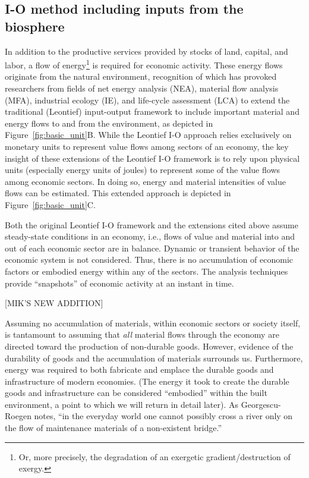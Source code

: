 \subsection{I-O method including inputs from the biosphere}
\label{sec:IO_resource}

In addition to the productive services provided by stocks of land, capital, and labor,
a flow of energy\footnote{Or, more precisely, 
the degradation of an exergetic gradient/destruction of exergy.} 
is required for economic activity. 
These energy flows originate from the natural environment, 
recognition of which has provoked researchers from fields of 
net energy analysis (NEA), 
material flow analysis (MFA), 
industrial ecology (IE), and 
life-cycle assessment (LCA) 
to extend the traditional (Leontief) input-output framework 
to include important material and energy flows to and from the environment, 
as depicted in Figure~\ref{fig:basic_unit}B.\cite{Carter1974,Bullard1975,Bullard1976a,Herendeen1978,Costanza:1980ww,Casler1984,Joshi:1999uw,Suh2009}
While the Leontief I-O approach relies exclusively 
on monetary units to represent value flows 
among sectors of an economy, 
the key insight of these extensions 
of the Leontief I-O framework is to rely upon physical units 
(especially energy units of joules) 
to represent some of the value flows among economic sectors. 
In doing so, energy and material intensities of value flows can be estimated. 
This extended approach is depicted in Figure~\ref{fig:basic_unit}C. 

Both the original Leontief I-O framework 
and the extensions cited above 
assume steady-state conditions in an economy, 
i.e., flows of value and material into 
and out of each economic sector are in balance. 
Dynamic or transient behavior 
of the economic system is not considered. 
Thus, there is no accumulation of economic factors 
or embodied energy within any of the sectors. 
The analysis techniques provide ``snapshots'' 
of economic activity at an instant in time.

[MIK'S NEW ADDITION]

Assuming no accumulation of materials, 
within economic sectors or society itself, 
is tantamount to assuming that \emph{all} material flows 
through the economy are directed toward the production of non-durable goods. 
However, evidence of the durability of goods 
and the accumulation of materials surrounds us. 
Furthermore, energy was required to both fabricate and emplace 
the durable goods and infrastructure of modern economies. 
(The energy it took to create the durable goods and infrastructure 
can be considered ``embodied'' within the built environment, 
a point to which we will return in detail later). 
As Georgescu-Roegen notes, 
``in the everyday world one cannot possibly cross a river 
only on the flow of maintenance materials of a non-existent bridge.''\cite{G-R1975}

